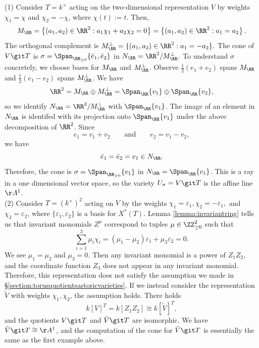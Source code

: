 \documentclass[12pt]{amsart}
\theoremstyle{plain}
\begin{document}
(1) 
Consider $T = k^\times$ acting on the two-dimensional representation $V$ by weights $\chi_1 = \chi$ and $\chi_2 = - \chi$, where $\chi(t) := t$.
Then,
$$M_\RR = \left\{(a_1, a_2) \in \RR^2 : a_1 \chi_1 + a_2 \chi_2 = 0\right\} = \left\{(a_1, a_2) \in \RR^2 : a_1 = a_2 \right\} .$$
The orthogonal complement is $M_\RR^\perp = \{(a_1, a_2) \in \RR^2 : a_1 = - a_2\}.$
The cone of $V \git T$ is $\sigma = \Span_{\RR_{\ge 0}}\{\bar e_1, \bar e_2\}$ in $N_\RR = \RR^2 / M_\RR^\perp.$
To understand $\sigma$ concretely, we choose bases for $M_\RR$ and $M_\RR^\perp$.
Observe $\frac{1}{2}(e_1+e_2)$ spans $M_\RR$ and $\frac{1}{2}(e_1-e_2)$ spans $M_\RR^\perp$.
We have
$$\RR^2 = M_\RR \oplus M_\RR^\perp = \Span_\RR \{v_1\} \oplus \Span_\RR\{v_2\},$$
so we identify $N_\RR = \RR^2 / M_\RR^\perp$ with $\Span_\RR\{v_1\}$.
The image of an element in $N_\RR$ is identifed with its projection onto $\Span_\RR\{v_1\}$ under the above decomposition of $\RR^2$.
Since
$$e_1 = v_1 + v_2 \qquad\text{and}\qquad e_2 = v_1 - v_2,$$
we have
$$\bar e_1 = \bar e_2 = v_1 \in N_\RR.$$
Therefore, the cone is $\sigma = \Span_{\RR_{\ge 0}}\{v_1\}$ in $N_\RR = \Span_{\RR}\{v_1\}$.
This is a ray in a one dimensional vector space, so the variety $U_\sigma = V \git T$ is the affine line $\AA^1$. \\

(2) Consider $T = (k^\times)^2$ acting on $V$ by the weights $\chi_1 = \varepsilon_1, \chi_2 = - \varepsilon_1,$ and $\chi_3 = \varepsilon_2$, where $\{\varepsilon_1, \varepsilon_2\}$ is a basis for $X^*(T)$. 
Lemma \ref{lemma:invariantring} tells us that invariant monomials $Z^\mu$ correspond to tuples $\mu \in \ZZ_{\ge 0}^2$ such that 
$$\sum_{i=1}^3 \mu_i \chi_i = (\mu_1 - \mu_2) \varepsilon_1 + \mu_3 \varepsilon_2 = 0.$$
We see $\mu_1 = \mu_2$ and $\mu_3 = 0$.
Then any invariant monomial is a power of $Z_1 Z_2$, and the coordinate function $Z_3$ does not appear in any invariant monomial.
Therefore, this representation does not satisfy the assumption we made in \S \ref{section:torusquotientsastoricvarieties}.
If we instead consider the representation $\tilde V$ with weights $\chi_1, \chi_2$, the assumption holds.
There holds
$$k[V]^T = k[Z_1 Z_2] \cong k[\tilde V]^T,$$
and the quotients $V \git T$ and $\tilde V \git T$ are isomorphic.
We have $\tilde V \git T \cong \AA^1$, and the computation of the cone for $\tilde V \git T$ is essentially the same as the first example above.
\\
\end{document}
